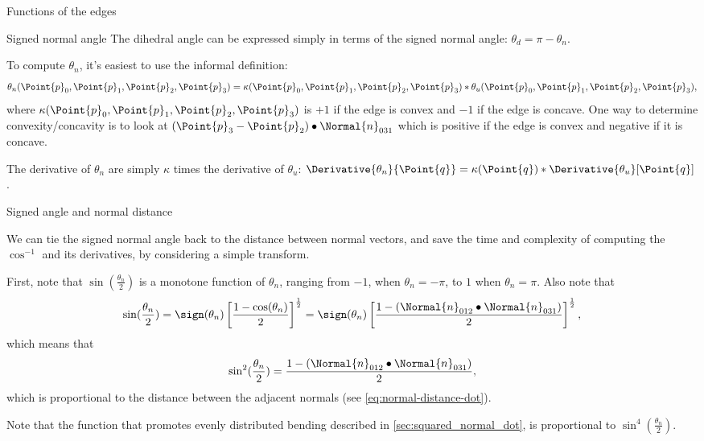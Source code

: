\begin{plSection}{Functions of the edges}
\begin{plSection}{Signed normal angle}
The dihedral angle can be expressed simply in terms of the
signed normal angle: $\theta_d = \pi - \theta_n$.

To compute $\theta_n$,
it's easiest to use the informal definition:
\begin{equation}
\theta_n(\Point{p}_0,\Point{p}_1,\Point{p}_2,\Point{p}_3)
= \kappa(\Point{p}_0,\Point{p}_1,\Point{p}_2,\Point{p}_3) \ast \theta_u(\Point{p}_0,\Point{p}_1,\Point{p}_2,\Point{p}_3),
\end{equation}
where $\kappa(\Point{p}_0,\Point{p}_1,\Point{p}_2,\Point{p}_3)$ is
$+1$ if the edge is convex
and
$-1$ if the edge is concave.
One way to determine convexity/concavity
is to look at
$\left(\Point{p}_3 - \Point{p}_2 \right) \bullet \Normal{n}_{031}$
which is positive if the edge is convex
and negative if it is concave.

The derivative of $\theta_n$ are simply $\kappa$
times the derivative of $\theta_u$:
$\Derivative{\theta_n}{\Point{q}} 
= 
\kappa(\Point{q}) \ast \Derivative{\theta_u}[\Point{q}]$.

\end{plSection}%

\begin{plSection}{Signed angle and normal distance}
\label{sec:Signed-angle-and-normal-distance}

We can tie the signed normal angle back 
to the distance between normal vectors,
and save the time and complexity
of computing the $\cos^{-1}$ and its derivatives,
by considering a simple transform.

First, note that $\sin(\frac{\theta_n}{2})$
is a monotone function of $\theta_n$,
ranging from $-1$, when $\theta_n = -\pi$,
to $1$ when $\theta_n = \pi$.
Also note that 
\begin{equation}
\sin(\frac{\theta_n}{2}) 
 = 
\sign(\theta_n) 
\left[ 
\frac{1 - \cos(\theta_n)}{2}
\right]^{\frac{1}{2}}
 = 
\sign(\theta_n) 
\left[ 
\frac{1-\left(\Normal{n}_{012}\bullet\Normal{n}_{031}\right)}{2} 
\right]^{\frac{1}{2}},
\end{equation}
which means that
\begin{equation}
\sin^2(\frac{\theta_n}{2}) 
= 
\frac{1-\left(\Normal{n}_{012}\bullet\Normal{n}_{031}\right)}{2},
\end{equation}
which is proportional to the distance between the adjacent normals
(see \cref{eq:normal-distance-dot}).

Note that the function that promotes evenly 
distributed bending described in \cref{sec:squared_normal_dot},
is proportional to $\sin^4(\frac{\theta_n}{2})$. 


\end{plSection}
\end{plSection}
